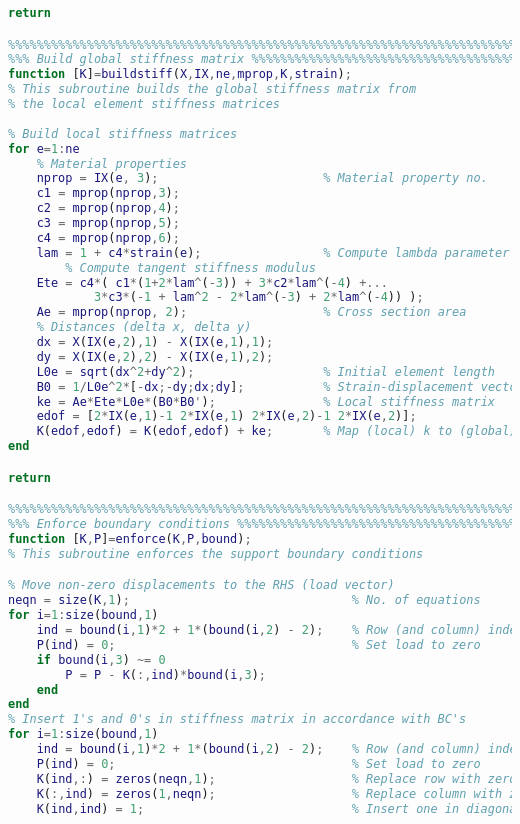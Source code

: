 \begin{lstlisting}[language=Matlab, caption = FE implementation for material non-linearity, label=lst:CodeMNA]
return

%%%%%%%%%%%%%%%%%%%%%%%%%%%%%%%%%%%%%%%%%%%%%%%%%%%%%%%%%%%%%%%%%%%%%%%%%%%
%%% Build global stiffness matrix %%%%%%%%%%%%%%%%%%%%%%%%%%%%%%%%%%%%%%%%%
function [K]=buildstiff(X,IX,ne,mprop,K,strain);
% This subroutine builds the global stiffness matrix from
% the local element stiffness matrices
    
% Build local stiffness matrices
for e=1:ne
    % Material properties
    nprop = IX(e, 3);                       % Material property no.
    c1 = mprop(nprop,3);
    c2 = mprop(nprop,4);
    c3 = mprop(nprop,5);
    c4 = mprop(nprop,6);
    lam = 1 + c4*strain(e);                 % Compute lambda parameter
        % Compute tangent stiffness modulus
    Ete = c4*( c1*(1+2*lam^(-3)) + 3*c2*lam^(-4) +...
            3*c3*(-1 + lam^2 - 2*lam^(-3) + 2*lam^(-4)) );
    Ae = mprop(nprop, 2);                   % Cross section area
    % Distances (delta x, delta y)
    dx = X(IX(e,2),1) - X(IX(e,1),1);
    dy = X(IX(e,2),2) - X(IX(e,1),2);                 
    L0e = sqrt(dx^2+dy^2);                  % Initial element length
    B0 = 1/L0e^2*[-dx;-dy;dx;dy];           % Strain-displacement vector
    ke = Ae*Ete*L0e*(B0*B0');               % Local stiffness matrix
    edof = [2*IX(e,1)-1 2*IX(e,1) 2*IX(e,2)-1 2*IX(e,2)];
    K(edof,edof) = K(edof,edof) + ke;       % Map (local) k to (global) K
end

return

%%%%%%%%%%%%%%%%%%%%%%%%%%%%%%%%%%%%%%%%%%%%%%%%%%%%%%%%%%%%%%%%%%%%%%%%%%%
%%% Enforce boundary conditions %%%%%%%%%%%%%%%%%%%%%%%%%%%%%%%%%%%%%%%%%%%
function [K,P]=enforce(K,P,bound);
% This subroutine enforces the support boundary conditions

% Move non-zero displacements to the RHS (load vector)
neqn = size(K,1);                               % No. of equations
for i=1:size(bound,1)
    ind = bound(i,1)*2 + 1*(bound(i,2) - 2);    % Row (and column) index
    P(ind) = 0;                                 % Set load to zero
    if bound(i,3) ~= 0
        P = P - K(:,ind)*bound(i,3);
    end
end
% Insert 1's and 0's in stiffness matrix in accordance with BC's
for i=1:size(bound,1)
    ind = bound(i,1)*2 + 1*(bound(i,2) - 2);    % Row (and column) index
    P(ind) = 0;                                 % Set load to zero
    K(ind,:) = zeros(neqn,1);                   % Replace row with zeros
    K(:,ind) = zeros(1,neqn);                   % Replace column with zeros
    K(ind,ind) = 1;                             % Insert one in diagonal
    

\end{lstlisting}
